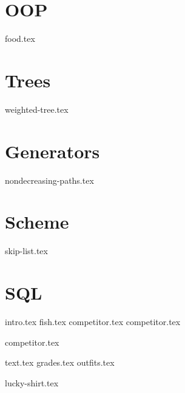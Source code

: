 \documentclass{exam}
\begin{document}
\section{OOP}
\begin{questions}
{food.tex}
\end{questions}
\newpage

\section{Trees}
\begin{questions}
{weighted-tree.tex}
\end{questions}
\newpage

\section{Generators}
\begin{questions}
{nondecreasing-paths.tex}
\end{questions}
\newpage

\section{Scheme}
\begin{questions}
{skip-list.tex}
\end{questions}

\section{SQL}
{intro.tex}
{fish.tex}
{competitor.tex}
{competitor.tex}

\begin{questions}
{competitor.tex}
\end{questions}
\newpage

{text.tex}
{grades.tex}
{outfits.tex}

\begin{questions}
{lucky-shirt.tex}
\end{questions}
\end{document}
